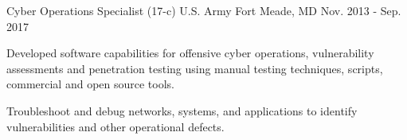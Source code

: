 \begin{cventries}
  \cventry
    {Cyber Operations Specialist (17-c)} %
    {U.S. Army} %
    {Fort Meade, MD} %
    {Nov. 2013 - Sep. 2017} %
    {
      \begin{cvitems} %
        \item {Developed software capabilities for offensive cyber operations, vulnerability assessments and penetration testing using manual testing techniques, scripts, commercial and open source tools.}
        \item {Troubleshoot and debug networks, systems, and applications to identify vulnerabilities and other operational defects.}
      \end{cvitems}
    }


\end{cventries}
